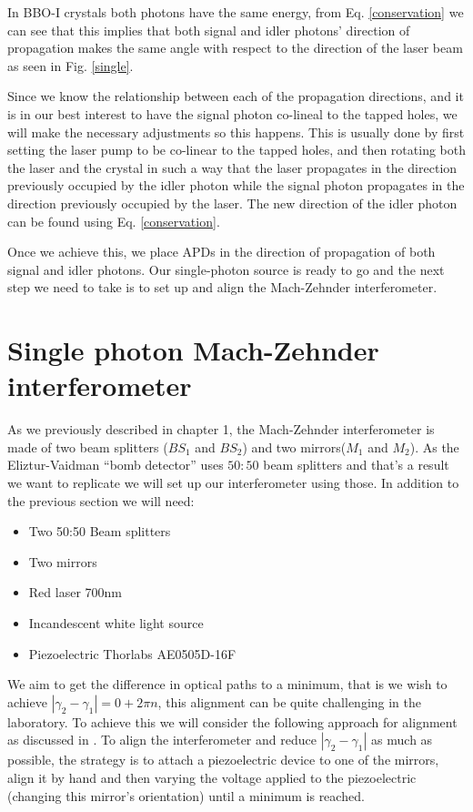 \documentclass{book}
\begin{document}
In BBO-I crystals both photons have the same energy, from Eq. \ref{conservation} we can see that this implies that both signal and idler photons' direction of propagation makes the same angle with respect to the direction of the laser beam as seen in Fig. \ref{single}.

Since we know the relationship between each of the propagation directions, and it is in our best interest to have the signal photon co-lineal to the tapped holes, we will make the necessary adjustments so this happens. This is usually done by first setting the laser pump to be co-linear to the tapped holes, and then rotating both the laser and the crystal in such a way that the laser propagates in the direction previously occupied by the idler photon while the signal photon propagates in the direction previously occupied by the laser. The new direction of the idler photon can be found using Eq. \ref{conservation}.

Once we achieve this, we place APDs in the direction of propagation of both signal and idler photons. Our single-photon source is ready to go and the next step we need to take is to set up and align the Mach-Zehnder interferometer.

\section{Single photon Mach-Zehnder interferometer}

As we previously described in chapter 1, the Mach-Zehnder interferometer is made of two beam splitters ($BS_{1}$ and $BS_{2}$) and two mirrors($M_{1}$ and $M_{2}$). As the Eliztur-Vaidman ``bomb detector'' uses $50:50$ beam splitters and that's a result we want to replicate we will set up our interferometer using those. In addition to the previous section we will need:

\begin{itemize}
\item Two 50:50 Beam splitters
\item Two mirrors
\item Red laser 700nm
\item Incandescent white light source
\item Piezoelectric Thorlabs AE0505D-16F
\end{itemize}

We aim to get the difference in optical paths to a minimum, that is we wish to achieve $|\gamma_{2}-\gamma_{1}|=0+2\pi n$, this alignment can be quite challenging in the laboratory. To achieve this we will consider the following approach for alignment as discussed in \cite{zuri}. To align the interferometer and reduce $|\gamma_{2}-\gamma_{1}|$ as much as possible, the strategy is to attach a piezoelectric device to one of the mirrors, align it by hand and then varying the voltage applied to the piezoelectric (changing this mirror's orientation) until a minimum is reached.
\end{document}
